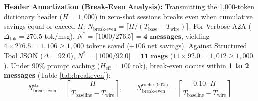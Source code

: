 \documentclass[9pt,a4paper]{extarticle}
\begin{document}
\textbf{Header Amortization (Break-Even Analysis):} Transmitting the 1,000-token dictionary header ($H=1{,}000$) in zero-shot sessions breaks even when cumulative savings equal or exceed $H$: $N_{\text{break-even}} = \lceil H / (T_{\text{base}} - T_{\text{wire}}) \rceil$. For Verbose A2A ($\Delta_{\text{tok}} = 276.5$ tok/msg), $N^* = \lceil 1000/276.5 \rceil = \mathbf{4\text{ messages}}$, yielding $4 \times 276.5 = 1{,}106 \ge 1{,}000$ tokens saved ($+106$ net savings). Against Structured Tool JSON ($\Delta = 92.0$), $N^* = \lceil 1000/92.0 \rceil = \mathbf{11\text{ msgs}}$ ($11 \times 92.0 = 1{,}012 \ge 1{,}000$). Under 90\% prompt caching ($H_{\text{eff}} = 100$ tok), break-even occurs within \textbf{1 to 2 messages} (Table \ref{tab:breakeven}):
\begin{equation}
  N_{\text{break-even}}^{\text{std}} = \left\lceil \frac{H}{T_{\text{baseline}} - T_{\text{wire}}} \right\rceil, \qquad
  N_{\text{break-even}}^{\text{cache (90\%)}} = \left\lceil \frac{0.10 \cdot H}{T_{\text{baseline}} - T_{\text{wire}}} \right\rceil
  \label{eq:breakeven}
\end{equation}
\end{document}
